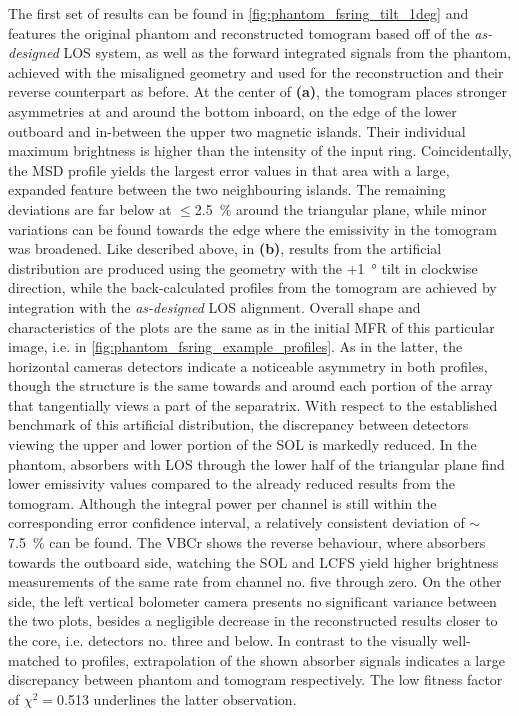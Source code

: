             The first set of results can be found in \cref{fig:phantom_fsring_tilt_1deg} and features the original phantom and reconstructed tomogram based off of the \textit{as-designed} LOS system, as well as the forward integrated signals from the phantom, achieved with the misaligned geometry and used for the reconstruction and their reverse counterpart as before. At the center of \textbf{(a)}, the tomogram places stronger asymmetries at and around the bottom inboard, on the edge of the lower outboard and in-between the upper two magnetic islands. Their individual maximum brightness is higher than the intensity of the input ring. Coincidentally, the MSD profile yields the largest error values in that area with a large, expanded feature between the two neighbouring islands. The remaining deviations are far below at $\le$\SI{2.5}{\percent} around the triangular plane, while minor variations can be found towards the edge where the emissivity in the tomogram was broadened. Like described above, in \textbf{(b)}, results from the artificial distribution are produced using the geometry with the +\SI{1}{\degree} tilt in clockwise direction, while the back-calculated profiles from the tomogram are achieved by integration with the \textit{as-designed} LOS alignment. Overall shape and characteristics of the plots are the same as in the initial MFR of this particular image, i.e. in \cref{fig:phantom_fsring_example_profiles}. As in the latter, the horizontal cameras detectors indicate a noticeable asymmetry in both profiles, though the structure is the same towards and around each portion of the array that tangentially views a part of the separatrix. With respect to the established benchmark of this artificial distribution, the discrepancy between detectors viewing the upper and lower portion of the SOL is markedly reduced. In the phantom, absorbers with LOS through the lower half of the triangular plane find lower emissivity values compared to the already reduced results from the tomogram. Although the integral power per channel is still within the corresponding error confidence interval, a relatively consistent deviation of $\sim$\SI{7.5}{\percent} can be found. The VBCr shows the reverse behaviour, where absorbers towards the outboard side, watching the SOL and LCFS yield higher brightness measurements of the same rate from channel no. five through zero. On the other side, the left vertical bolometer camera presents no significant variance between the two plots, besides a negligible decrease in the reconstructed results closer to the core, i.e. detectors no. three and below. In contrast to the visually well-matched to profiles, extrapolation of the shown absorber signals indicates a large discrepancy between phantom and tomogram respectively. The low fitness factor of $\chi^{2}=$\SI{0.513}{\arbitraryunit} underlines the latter observation.\\%
